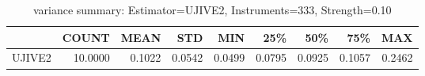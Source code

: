 \begin{table}[ht]
\centering
\caption{variance summary: Estimator=UJIVE2, Instruments=333, Strength=0.10}
\begin{tabular}{lrrrrrrrr}
\toprule
 & COUNT & MEAN & STD & MIN & 25\% & 50\% & 75\% & MAX \\
\midrule
UJIVE2 & 10.0000 & 0.1022 & 0.0542 & 0.0499 & 0.0795 & 0.0925 & 0.1057 & 0.2462 \\
\bottomrule
\end{tabular}
\end{table}

